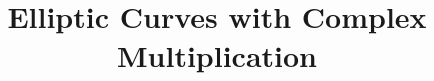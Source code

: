 \documentclass{amsart}
\title{Elliptic Curves with Complex Multiplication}
\theoremstyle{definition}
\begin{document}
\maketitle{}







\end{document}
